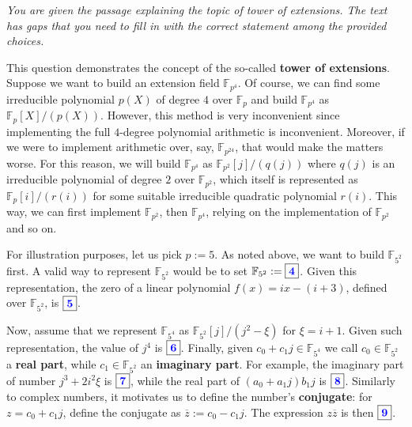\documentclass[../lecture-notes.tex]{subfiles}
\begin{document}
\begin{tcolorbox}[colback=blue!5!white,fonttitle=\bfseries,colframe=blue!80!white,title=Exercises 4-9. Tower of Extensions]
    \textit{You are given the passage explaining the topic of tower of extensions. The text has gaps that you need to fill in with the correct statement among the provided choices.}
    \vspace{10px}
    
    This question demonstrates the concept of the so-called \textbf{tower of extensions}. Suppose we want to build an extension field $\mathbb{F}_{p^4}$. Of course, we can find some irreducible polynomial $p(X)$ of degree $4$ over $\mathbb{F}_p$ and build $\mathbb{F}_{p^4}$ as $\mathbb{F}_p[X]/(p(X))$. However, this method is very inconvenient since implementing the full $4$-degree polynomial arithmetic is inconvenient. Moreover, if we were to implement arithmetic over, say, $\mathbb{F}_{p^{24}}$, that would make the matters worse. For this reason, we will build $\mathbb{F}_{p^4}$ as $\mathbb{F}_{p^2}[j]/(q(j))$ where $q(j)$ is an irreducible polynomial of degree $2$ over $\mathbb{F}_{p^2}$, which itself is represented as $\mathbb{F}_p[i]/(r(i))$ for some suitable irreducible quadratic polynomial $r(i)$. This way, we can first implement $\mathbb{F}_{p^2}$, then $\mathbb{F}_{p^4}$, relying on the implementation of $\mathbb{F}_{p^2}$ and so on.
    \vspace{5px}

    For illustration purposes, let us pick $p:=5$. As noted above, we want to build $\mathbb{F}_{5^2}$ first. A valid way to represent $\mathbb{F}_{5^2}$ would be to set $\mathbb{F}_{5^2} := \boxed{\textcolor{blue}{\textbf{4}}}$. Given this representation, the zero of a linear polynomial $f(x) = ix - (i+3)$, defined over $\mathbb{F}_{5^2}$, is $\boxed{\textcolor{blue}{\textbf{5}}}$.
    \vspace{5px}

    Now, assume that we represent $\mathbb{F}_{5^4}$ as $\mathbb{F}_{5^2}[j]/(j^2-\xi)$ for $\xi = i+1$. Given such representation, the value of $j^4$ is $\boxed{\textcolor{blue}{\textbf{6}}}$. Finally, given $c_0+c_1j \in \mathbb{F}_{5^4}$ we call $c_0 \in \mathbb{F}_{5^2}$ a \textbf{real part}, while $c_1 \in \mathbb{F}_{5^2}$ an \textbf{imaginary part}. For example, the imaginary part of number $j^3+2i^2\xi$ is $\boxed{\textcolor{blue}{\textbf{7}}}$, while the real part of $(a_0+a_1j)b_1j$ is $\boxed{\textcolor{blue}{\textbf{8}}}$. Similarly to complex numbers, it motivates us to define the number's \textbf{conjugate}: for $z = c_0+c_1j$, define the conjugate as $\overline{z} := c_0-c_1j$. The expression $z\overline{z}$ is then $\boxed{\textcolor{blue}{\textbf{9}}}$.
\end{tcolorbox}
\end{document}
